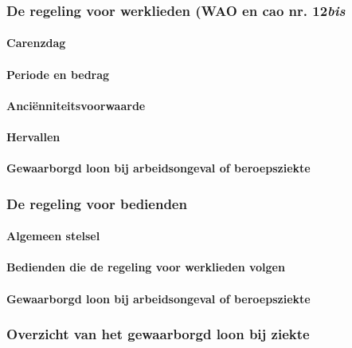 \subsubsection{De regeling voor werklieden (WAO en cao nr. 12\textit{bis}}

\paragraph{Carenzdag}

\paragraph{Periode en bedrag}

\paragraph{Anciënniteitsvoorwaarde}

\paragraph{Hervallen}

\paragraph{Gewaarborgd loon bij arbeidsongeval of beroepsziekte}

\subsubsection{De regeling voor bedienden}

\paragraph{Algemeen stelsel}

\paragraph{Bedienden die de regeling voor werklieden volgen}

\paragraph{Gewaarborgd loon bij arbeidsongeval of beroepsziekte}

\subsubsection{Overzicht van het gewaarborgd loon bij ziekte}

